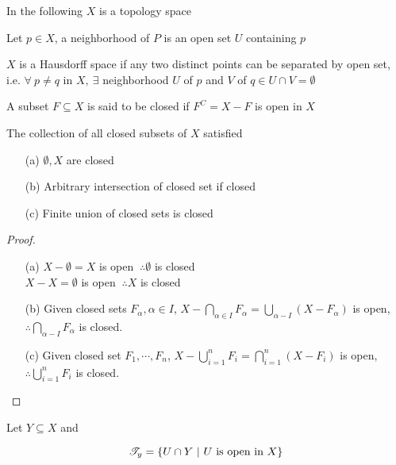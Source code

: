 In the following $X$ is a topology space

\begin{defn}[neighborhood]
	Let $p \in X$, a neighborhood of $P$ is an open set $U$ containing $p$  
\end{defn}

\begin{defn}
	$X$ is a Hausdorff space if any two distinct points can be separated by open set, i.e. $\forall ~p \neq q$ in $X,~\exists$ neighborhood $U$ of $p$ and $V$ of $q \in U \cap V = \emptyset$
\end{defn}

\begin{defn}
	A subset $F \subseteq X$ is said to be closed if $F^C = X - F$ is open in $X$
\end{defn}

\begin{thm}
	The collection of all closed subsets of $X$ satisfied
	
	\begin{enumerate}
		\item[(a)] $\emptyset, X$ are closed
		\item[(b)] Arbitrary intersection of closed set if closed
		\item[(c)] Finite union of closed sets is closed
	\end{enumerate}
\end{thm} 
\newpage

\begin{proof}$ $\\
	\begin{enumerate}
		\item[(a)] $X - \emptyset = X $ is open $~\therefore \emptyset$ is closed\\
	$X - X = \emptyset$ is open $~\therefore X$ is closed
		\item[(b)] Given closed sets $F_{\alpha},\alpha \in I$, $X - \bigcap_{\alpha \in I}F_{\alpha} = \bigcup_{\alpha - I}(X - F_{\alpha})$ is open,$\therefore \bigcap_{\alpha - I}F_{\alpha}$ is closed.
		\item[(c)] Given closed set $F_1,\cdots,F_n$, $X - \bigcup_{i=1}^{n}F_i = \bigcap^n_{i=1}(X-F_i)$ is open, $\therefore \bigcup^n_{i=1}F_i$ is closed.
	\end{enumerate}
	
\end{proof}

\begin{defn}
	Let $Y \subseteq X$ and
	
	$$\mathscr{T}_y = \{U \cap Y ~|~U \text{ is open in }X\}$$
\end{defn}

